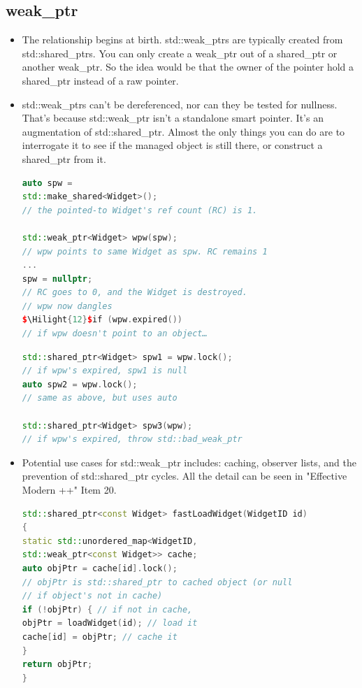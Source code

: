 \documentclass[a4paper,12pt,twoside]{book}
\newcommand{\Hilight}[1]{\makebox[0pt][l]{\color{yellow}\rule[-3pt]{#1em}{11pt}}}
\begin{document}
\subsection{weak\_ptr}
\begin{itemize}

\item The relationship begins at birth. std::weak\_ptrs are typically created from std::shared\_ptrs. You can only create a weak\_ptr out of a shared\_ptr or another weak\_ptr. So the idea would be that the owner of the pointer hold a shared\_ptr instead of a raw pointer.



\item std::weak\_ptrs can't be dereferenced, nor can they be tested for nullness. That's because std::weak\_ptr isn't a standalone smart pointer. It's an augmentation of std::shared\_ptr. Almost the only things you can do are to interrogate it to see if the managed object is still there, or construct a shared\_ptr from it.

\begin{lstlisting}[frame=single, language=c++,mathescape=true]
auto spw =
std::make_shared<Widget>();
// the pointed-to Widget's ref count (RC) is 1.

std::weak_ptr<Widget> wpw(spw);
// wpw points to same Widget as spw. RC remains 1
...
spw = nullptr;
// RC goes to 0, and the Widget is destroyed.
// wpw now dangles
$\Hilight{12}$if (wpw.expired())
// if wpw doesn't point to an object…
\end{lstlisting}

\begin{lstlisting}[frame=single, language=c++,mathescape=true]
std::shared_ptr<Widget> spw1 = wpw.lock();
// if wpw's expired, spw1 is null
auto spw2 = wpw.lock();
// same as above, but uses auto

std::shared_ptr<Widget> spw3(wpw);
// if wpw's expired, throw std::bad_weak_ptr
\end{lstlisting}


\item Potential use cases for std::weak\_ptr includes: caching, observer lists, and the prevention of std::shared\_ptr cycles.  All the detail can be seen in "Effective Modern ++" Item 20.
\begin{lstlisting}[frame=single, language=c++]
std::shared_ptr<const Widget> fastLoadWidget(WidgetID id)
{
static std::unordered_map<WidgetID,
std::weak_ptr<const Widget>> cache;
auto objPtr = cache[id].lock();
// objPtr is std::shared_ptr to cached object (or null
// if object's not in cache)
if (!objPtr) { // if not in cache,
objPtr = loadWidget(id); // load it
cache[id] = objPtr; // cache it
}
return objPtr;
}
\end{lstlisting}


\end{itemize}
\end{document}
